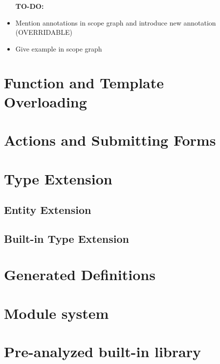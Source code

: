       \begin{itemize}
        \item [\textbf{TO-DO:}]
        \item Mention annotations in scope graph and introduce new annotation (OVERRIDABLE)
        \item Give example in scope graph
      \end{itemize}

  \section{\label{sec:function-template-overloading}Function and Template Overloading}

  \section{\label{sec:actions-and-submitting-forms}Actions and Submitting Forms}

  \section{\label{sec:type-extension}Type Extension}

    \subsection{\label{subsec:entity-extension}Entity Extension}

    \subsection{\label{subsec:built-in-extension}Built-in Type Extension}

  \section{\label{sec:generated-definitions}Generated Definitions}

  \section{\label{sec:module-system}Module system}

  \section{\label{sec:built-in-library}Pre-analyzed built-in library}


